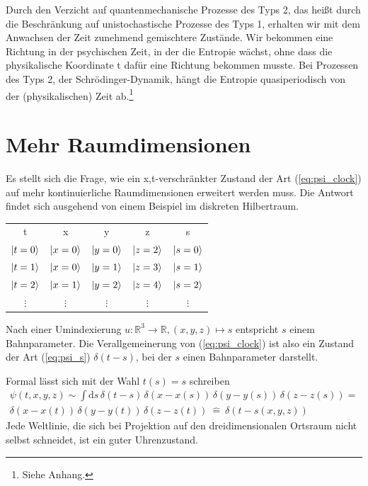 \documentclass[12pt]{article}
\begin{document}
Durch den Verzicht auf quantenmechanische Prozesse des Typs 2, das heißt durch die Beschränkung auf unistochastische Prozesse des Typs 1, erhalten wir mit dem Anwachsen der Zeit zunehmend gemischtere Zustände. Wir bekommen eine Richtung in der psychischen Zeit, in der die Entropie wächst, ohne dass die physikalische Koordinate t dafür eine Richtung bekommen musste. Bei Prozessen des Typs 2, der Schrödinger-Dynamik, hängt die Entropie quasiperiodisch von der (physikalischen) Zeit ab.\footnote{Siehe Anhang.}

\section{Mehr Raumdimensionen}

Es stellt sich die Frage, wie ein x,t-verschränkter Zustand der Art (\ref{eq:psi_clock}) auf mehr kontinuierliche Raumdimensionen erweitert werden muss. Die Antwort findet sich ausgehend von einem Beispiel im diskreten Hilbertraum.
\begin{center}
\begin{tabular}{ |c|c|c|c|c| } 
 \hline
 t & x & y & z & s \\ 
 $\ket{t=0}$ & $\ket{x=0}$ & $\ket{y=0}$ & $\ket{z=2}$ & $\ket{s=0}$  \\
 $\ket{t=1}$ & $\ket{x=0}$ & $\ket{y=1}$ & $\ket{z=3}$ & $\ket{s=1}$  \\
 $\ket{t=2}$ & $\ket{x=1}$ & $\ket{y=2}$ & $\ket{z=4}$ & $\ket{s=2}$  \\
 $\vdots$ & $\vdots$ & $\vdots$ & $\vdots$ & $\vdots$ \\
 \hline
\end{tabular}
\end{center}
Nach einer Umindexierung $u: \mathbb{R}^3 \rightarrow \mathbb{R}, (x,y,z) \mapsto s$ entspricht $s$ einem Bahnparameter. Die Verallgemeinerung von (\ref{eq:psi_clock}) ist also ein Zustand der Art (\ref{eq:psi_s}) $\delta(t-s)$, bei der $s$ einen Bahnparameter darstellt.

Formal lässt sich mit der Wahl $t(s) = s$ schreiben
\begin{equation} 
\begin{split}
\label{eq:psi_clock_3d_space}
\psi(t,x,y,z) \sim \int \mathrm ds \, \delta(t-s) \, \delta(x-x(s)) \, \delta(y-y(s)) \, \delta(z-z(s)) = 
\\
\delta(x-x(t)) \, \delta(y-y(t)) \, \delta(z-z(t)) \ \hat{=}\ \delta(t-s(x,y,z))
\end{split}
\end{equation}
Jede Weltlinie, die sich bei Projektion auf den dreidimensionalen Ortsraum nicht selbst schneidet, ist ein guter Uhrenzustand. 
\end{document}
